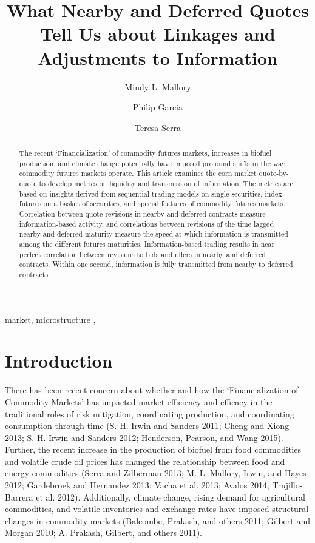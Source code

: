 \documentclass[]{elsarticle} %
\begin{document}
\begin{frontmatter}

  \title{What Nearby and Deferred Quotes Tell Us about Linkages and Adjustments
to Information}
    \author[University of Illinois]{Mindy L. Mallory}
    \author[University of Illinois]{Philip Garcia}
  
    \author[University of Illinois]{Teresa Serra}
  
      \address[University of Illinois]{Agricultural and Consumer Economics, 1301 W Gregory Dr, Urbana, IL,
61801}
  
  \begin{abstract}
  The recent `Financialization' of commodity futures markets, increases in
  biofuel production, and climate change potentially have imposed profound
  shifts in the way commodity futures markets operate. This article
  examines the corn market quote-by-quote to develop metrics on liquidity
  and transmission of information. The metrics are based on insights
  derived from sequential trading models on single securities, index
  futures on a basket of securities, and special features of commodity
  futures markets. Correlation between quote revisions in nearby and
  deferred contracts measure information-based activity, and correlations
  between revisions of the time lagged nearby and deferred maturity
  measure the speed at which information is transmitted among the
  different futures maturities. Information-based trading results in near
  perfect correlation between revisions to bids and offers in nearby and
  deferred contracts. Within one second, information is fully transmitted
  from nearby to deferred contracts.
  \end{abstract}
   \begin{keyword} market, microstructure \sep \end{keyword}
 \end{frontmatter}

\section{Introduction}\label{introduction}

There has been recent concern about whether and how the
`Financialization of Commodity Markets' has impacted market efficiency
and efficacy in the traditional roles of risk mitigation, coordinating
production, and coordinating consumption through time (S. H. Irwin and
Sanders 2011; Cheng and Xiong 2013; S. H. Irwin and Sanders 2012;
Henderson, Pearson, and Wang 2015). Further, the recent increase in the
production of biofuel from food commodities and volatile crude oil
prices has changed the relationship between food and energy commodities
(Serra and Zilberman 2013; M. L. Mallory, Irwin, and Hayes 2012;
Gardebroek and Hernandez 2013; Vacha et al. 2013; Avalos 2014;
Trujillo-Barrera et al. 2012). Additionally, climate change, rising
demand for agricultural commodities, and volatile inventories and
exchange rates have imposed structural changes in commodity markets
(Balcombe, Prakash, and others 2011; Gilbert and Morgan 2010; A.
Prakash, Gilbert, and others 2011).
\end{document}
